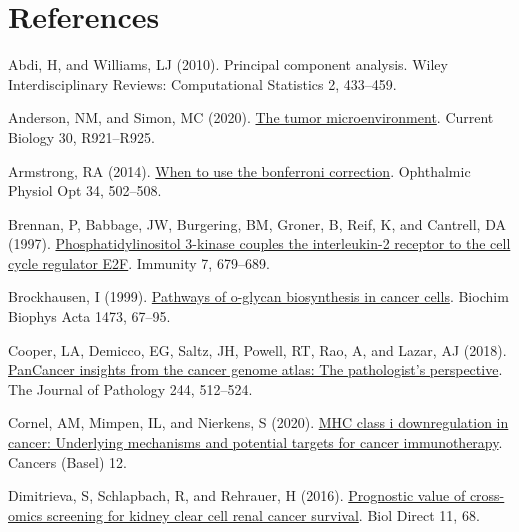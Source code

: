 \documentclass[
  parskip,
  oneside]{scrreprt}
\newlength{\cslhangindent}
\newlength{\cslentryspacingunit} %
\newenvironment{CSLReferences}[2] %
 {%
  \setlength{\parindent}{0pt}
  \ifodd #1
  \let\oldpar\par
  \def\par{\hangindent=\cslhangindent\oldpar}
  \fi
  \setlength{\parskip}{#2\cslentryspacingunit}
 }%
 {}
\begin{document}
\hypertarget{references}{%
\chapter{References}\label{references}}

\hypertarget{refs}{}
\begin{CSLReferences}{0}{0}
\leavevmode{}%
Abdi, H, and Williams, LJ (2010). Principal component analysis. Wiley
Interdisciplinary Reviews: Computational Statistics 2, 433--459.

\leavevmode{}%
Anderson, NM, and Simon, MC (2020).
\href{https://doi.org/10.1016/j.cub.2020.06.081}{The tumor
microenvironment}. Current Biology 30, R921--R925.

\leavevmode{}%
Armstrong, RA (2014). \href{https://doi.org/10.1111/opo.12131}{When to
use the bonferroni correction}. Ophthalmic Physiol Opt 34, 502--508.

\leavevmode{}%
Brennan, P, Babbage, JW, Burgering, BM, Groner, B, Reif, K, and
Cantrell, DA (1997).
\href{https://doi.org/10.1016/s1074-7613(00)80388-x}{Phosphatidylinositol
3-kinase couples the interleukin-2 receptor to the cell cycle regulator
E2F}. Immunity 7, 679--689.

\leavevmode{}%
Brockhausen, I (1999).
\href{https://doi.org/10.1016/s0304-4165(99)00170-1}{Pathways of
o-glycan biosynthesis in cancer cells}. Biochim Biophys Acta 1473,
67--95.

\leavevmode{}%
Cooper, LA, Demicco, EG, Saltz, JH, Powell, RT, Rao, A, and Lazar, AJ
(2018). \href{https://doi.org/10.1002/path.5028}{PanCancer insights from
the cancer genome atlas: The pathologist's perspective}. The Journal of
Pathology 244, 512--524.

\leavevmode{}%
Cornel, AM, Mimpen, IL, and Nierkens, S (2020).
\href{https://doi.org/10.3390/cancers12071760}{MHC class i
downregulation in cancer: Underlying mechanisms and potential targets
for cancer immunotherapy}. Cancers (Basel) 12.

\leavevmode{}%
Dimitrieva, S, Schlapbach, R, and Rehrauer, H (2016).
\href{https://doi.org/10.1186/s13062-016-0170-1}{Prognostic value of
cross-omics screening for kidney clear cell renal cancer survival}. Biol
Direct 11, 68.


\end{CSLReferences}
\end{document}
